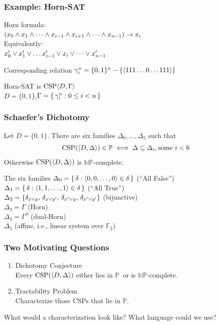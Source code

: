 \documentclass[12pt,xcolor=dvipsnames%
]{beamer}
\renewcommand{\cite}[1]{\relax}
\newcommand{\bigpause}{\pause\bigskip}
\DeclareMathOperator{\CSP}{CSP}
\newcommand{\FF}{\mathbb{F}}
\renewcommand{\.}{\cdot}
\newcommand{\NP}{\ensuremath{\mathbb{NP}}\xspace}
\renewcommand{\P}{\ensuremath{\mathbb{P}}\xspace}
\let\emph=\alert
\begin{document}
\begin{frame}
\frametitle{Example: Horn-SAT}
\emph{Horn formula:}\\
 $(x_0 \wedge x_1 \wedge \cdots \wedge x_{i-1} \wedge x_{i+1} \wedge \cdots \wedge x_{n-1}) \rightarrow x_i$\\[6pt]
\emph{Equivalently:}\\
 $x_0' \vee x_1' \vee \dots x_{i-1}' \vee x_i \vee \cdots \vee x_{n-1}'$

\bigpause
Corresponding relation $\gamma^n_i = \{0,1\}^n-\{\langle111\dots0\dots111\rangle\}$

\bigpause
Horn-SAT is $\CSP\<D,\Gamma\>$\\
$D=\{0,1\}$,\quad $\Gamma=\left\{\,\gamma^n_i : 0\leq i <n\,\right\}$
\end{frame}

\begin{frame}
  \frametitle{Schaefer's Dichotomy}

  \begin{theorem}[Schaefer, 1978 \cite{Schaefer1978}]
    Let $D=\{0,1\}$. There are six families $\Delta_0,
  \dots, \Delta_5$ such that
  \begin{equation*}
    \CSP(\<D,\Delta\>) \in \P \iff \Delta \sseq \Delta_i, \text{some $i< 6$}
  \end{equation*}
  Otherwise $\CSP(\<D,\Delta\>)$ is $\NP$-complete.
\end{theorem}
\end{frame}

\begin{frame}
{\large The six families}
$\Delta_0 = \left\{\,\delta : \langle0,0,\dots,0\rangle\in \delta\,\right\}$ (``All False'')\\[2pt]
$\Delta_1 = \left\{\,\delta : \langle1,1,\dots,1\rangle\in \delta\,\right\}$ (``All True'')\\[2pt]
$\Delta_2 = \{\delta_{x\vee y},\, \delta_{x\vee y'},\,\delta_{x'\vee y},\, \delta_{x'\vee y'}\}$ (bijunctive)\\[2pt]
$\Delta_3 = \Gamma$ (Horn)\\[2pt]
$\Delta_4 = \Gamma^\partial$ (dual-Horn)\\[2pt]
$\Delta_5$ (affine, i.e., linear system over $\FF_2$)
\end{frame}

\begin{frame}
  \frametitle{Two Motivating Questions}

  \begin{enumerate}
  \item \emph{Dichotomy Conjecture}\\ Every $\CSP(\<D,\Delta\>)$ either
    lies in \P\ or is $\NP$-complete.

    \pause

  \item \emph{Tractability Problem}\\ Characterize those CSPs that lie in \P.
  \end{enumerate}
  
  \pause
  What would a characterization look like? What language could we use?
\end{frame}
\end{document}
